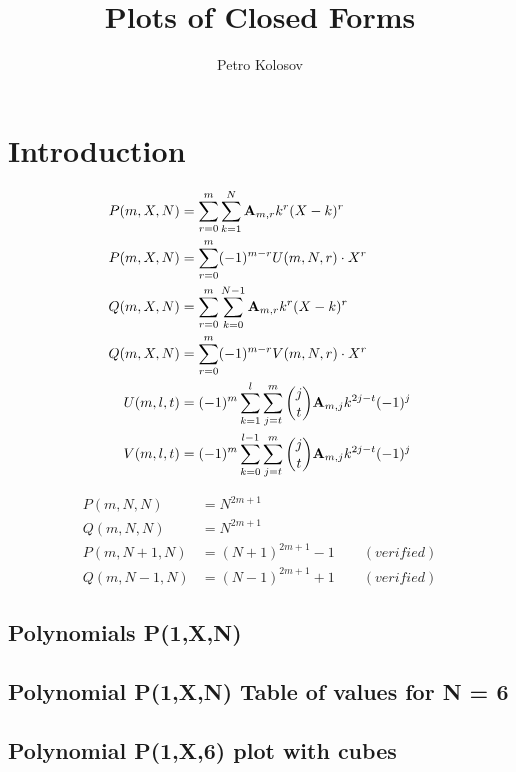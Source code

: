 \documentclass[12pt,letterpaper,oneside,reqno]{amsart}
\title[Plots of Closed Forms]
{Plots of Closed Forms}
\author[Petro Kolosov]{Petro Kolosov}
\newcommand \coeffA [3][A] {{\mathbf{#1}} \sb{#2,#3}}
\newcommand \polynomialP [4][P]{{#1}(#2,#3,#4)}
\newcommand \polynomialQ [4][Q]{{#1}(#2,#3,#4)}
\begin{document}
    \maketitle

    \tableofcontents


    \section{Introduction}\label{sec:introduction}
    \begin{align*}
        \polynomialP{m}{X}{N} &= \sum_{r=0}^{m} \sum_{k=1}^{N} \coeffA{m}{r} k^r (X-k)^r \\
        \polynomialP{m}{X}{N} &= \sum_{r=0}^{m} (-1)^{m-r} U(m, N, r) \cdot X^{r} \\
        \polynomialQ{m}{X}{N} &= \sum_{r=0}^{m} \sum_{k=0}^{N-1} \coeffA{m}{r} k^r (X-k)^r \\
        \polynomialQ{m}{X}{N} &= \sum_{r=0}^{m} (-1)^{m-r} V(m, N, r) \cdot X^{r} \\
        U(m, l, t) &= (-1)^m \sum_{k=1}^{l} \sum_{j=t}^{m} \binom{j}{t} \coeffA{m}{j} k^{2j-t} (-1)^j \\
        V(m, l, t) &= (-1)^m \sum_{k=0}^{l-1}  \sum_{j=t}^{m} \binom{j}{t} \coeffA{m}{j} k^{2j-t} (-1)^j
    \end{align*}

    \begin{align*}
        \polynomialP{m}{N}{N} &= N^{2m+1} \\
        \polynomialQ{m}{N}{N} &= N^{2m+1} \\
        \polynomialP{m}{N+1}{N} &= (N+1)^{2m+1} - 1 \quad \quad (verified) \\
        \polynomialQ{m}{N-1}{N} &= (N-1)^{2m+1} + 1 \quad \quad (verified)
    \end{align*}


    \subsection{Polynomials P(1,X,N)}
    

    \subsection{Polynomial P(1,X,N) Table of values for N = 6}
    

    \subsection{Polynomial P(1,X,6) plot with cubes}
    
\end{document}
